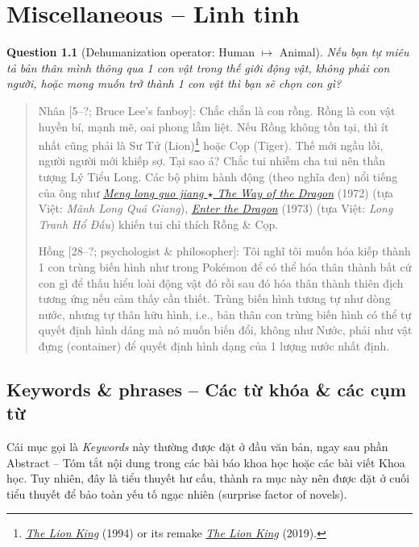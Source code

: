 \documentclass[12pt,twoside]{book}
\newtheorem{question}{Question}
\begin{document}
\chapter{Miscellaneous -- Linh tinh}
\minitoc
\begin{question}[Dehumanization operator: Human $\mapsto$ Animal]
	Nếu bạn tự miêu tả bản thân mình thông qua 1 con vật trong thế giới động vật, không phải con người, hoặc mong muốn trở thành 1 con vật thì bạn sẽ chọn con gì?
\end{question}

\begin{quote}
	{\sf Nhân [5--?; {\sc Bruce Lee}'s fanboy]}: Chắc chắn là con rồng. Rồng là con vật huyền bí, mạnh mẽ, oai phong lẵm liệt. Nếu Rồng không tồn tại, thì ít nhất cũng phải là Sư Tử (Lion)\footnote{\href{https://www.imdb.com/title/tt0110357/}{\it The Lion King} (1994) or its remake \href{https://www.imdb.com/title/tt6105098/}{\it The Lion King} (2019).} hoặc Cọp (Tiger). Thế mới ngầu lồi, người người mới khiếp sợ. Tại sao á? Chắc tui nhiễm cha tui nên thần tượng {\sc Lý Tiểu Long}. Các bộ phim hành động (theo nghĩa đen) nổi tiếng của ông như \href{https://www.imdb.com/title/tt0068935}{\it Meng long guo jiang $\star$ The Way of the Dragon} (1972) (tựa Việt: {\it Mãnh Long Quá Giang}), \href{https://www.imdb.com/title/tt0070034}{\it Enter the Dragon} (1973) (tựa Việt: {\it Long Tranh Hổ Đấu}) khiến tui chỉ thích Rồng \& Cọp.
	
	{\sf Hồng [28--?; psychologist \& philosopher]}: Tôi nghĩ tôi muốn hóa kiếp thành 1 con trùng biến hình như trong Pokémon để có thể hóa thân thành bất cứ con gì để thấu hiểu loài động vật đó rồi sau đó hóa thân thành thiên địch tương ứng nếu cảm thấy cần thiết. Trùng biến hình tương tự như dòng nước, nhưng tự thân hữu hình, i.e., bản thân con trùng biến hình có thể tự quyết định hình dáng mà nó muốn biến đổi, không như Nước, phải như vật đựng (container) để quyết định hình dạng của 1 lượng nước nhất định.
\end{quote}

\section{Keywords \& phrases -- Các từ khóa \& các cụm từ}
Cái mục gọi là {\it Keywords} này thường được đặt ở đầu văn bản, ngay sau phần Abstract -- Tóm tắt nội dung trong các bài báo khoa học hoặc các bài viết Khoa học. Tuy nhiên, đây là tiểu thuyết hư cấu, thành ra mục này nên được đặt ở cuối tiểu thuyết để bảo toàn yếu tố ngạc nhiên (surprise factor of novels).
\end{document}
